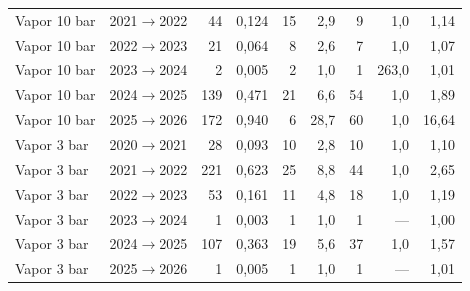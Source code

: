 {\begin{xltabular}{\linewidth}{@{}llrrrrrrr@{}}
Vapor 10 bar & 2021$\to$2022 & 44 & 0,124 & 15 & 2,9 & 9 & 1,0 & 1,14 \\
Vapor 10 bar & 2022$\to$2023 & 21 & 0,064 & 8 & 2,6 & 7 & 1,0 & 1,07 \\
Vapor 10 bar & 2023$\to$2024 & 2 & 0,005 & 2 & 1,0 & 1 & 263,0 & 1,01 \\
Vapor 10 bar & 2024$\to$2025 & 139 & 0,471 & 21 & 6,6 & 54 & 1,0 & 1,89 \\
Vapor 10 bar & 2025$\to$2026 & 172 & 0,940 & 6 & 28,7 & 60 & 1,0 & 16,64 \\
Vapor 3 bar & 2020$\to$2021 & 28 & 0,093 & 10 & 2,8 & 10 & 1,0 & 1,10 \\
Vapor 3 bar & 2021$\to$2022 & 221 & 0,623 & 25 & 8,8 & 44 & 1,0 & 2,65 \\
Vapor 3 bar & 2022$\to$2023 & 53 & 0,161 & 11 & 4,8 & 18 & 1,0 & 1,19 \\
Vapor 3 bar & 2023$\to$2024 & 1 & 0,003 & 1 & 1,0 & 1 & --- & 1,00 \\
Vapor 3 bar & 2024$\to$2025 & 107 & 0,363 & 19 & 5,6 & 37 & 1,0 & 1,57 \\
Vapor 3 bar & 2025$\to$2026 & 1 & 0,005 & 1 & 1,0 & 1 & --- & 1,01 \\
\end{xltabular}
}
